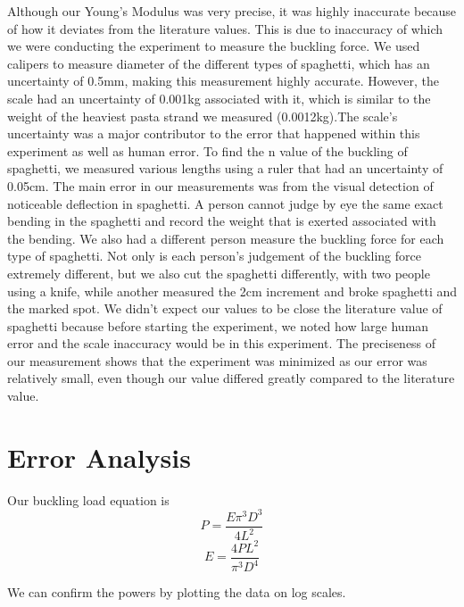 \documentclass[12pt]{article}
\begin{document}
Although our Young's Modulus was very precise, it was highly inaccurate because of how it deviates from the literature values. This is due to inaccuracy of which we were conducting the experiment to measure the buckling force. We used calipers to measure diameter of the different types of spaghetti, which has an uncertainty of 0.5mm, making this measurement highly accurate. However, the scale had an uncertainty of 0.001kg associated with it, which is similar to the weight of the heaviest pasta strand we measured (0.0012kg).The scale's uncertainty was a major contributor to the error that happened within this experiment as well as human error.  To find the n value of the buckling of spaghetti, we measured various lengths using a ruler that had an uncertainty of 0.05cm. The main error in our measurements was from the visual detection of noticeable deflection in spaghetti. A person cannot judge by eye the same exact bending in the spaghetti and record the weight that is exerted associated with the bending. We also had a different person measure the buckling force for each type of spaghetti. Not only is each person’s judgement of the buckling force extremely different, but we also cut the spaghetti differently, with two people using a knife, while another measured the 2cm increment and broke spaghetti and the marked spot. We didn't expect our values to be close the literature value of spaghetti because before starting the experiment, we noted how large human error and the scale inaccuracy would be in this experiment. The preciseness of our measurement shows that the experiment was minimized as our error was relatively small, even though our value differed greatly compared to the literature value.

\section{Error Analysis}

Our buckling load equation is
$$P = \frac{E\pi ^3D^3}{4L^2}$$
$$E = \frac{4PL^2}{\pi ^3D^4}$$

We can confirm the powers by plotting the data on log scales.
\end{document}
